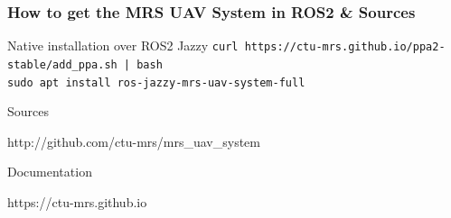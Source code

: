 \documentclass[aspectratio=169,9pt]{beamer}
\begin{document}


\begin{frame}
  \frametitle{How to get the MRS UAV System in ROS2 \& Sources}

  \begin{block}{Native installation over ROS2 Jazzy}
    \texttt{curl https://ctu-mrs.github.io/ppa2-stable/add\_ppa.sh | bash}\\
    \texttt{sudo apt install ros-jazzy-mrs-uav-system-full}
  \end{block}

  \begin{block}{Sources}
    \begin{center}
      \large {\color{blue} http://github.com/ctu-mrs/mrs\_uav\_system}
    \end{center}
  \end{block}

  \begin{block}{Documentation}
    \begin{center}
      \large {\color{blue} https://ctu-mrs.github.io}
    \end{center}
  \end{block}

\end{frame}







\end{document}
